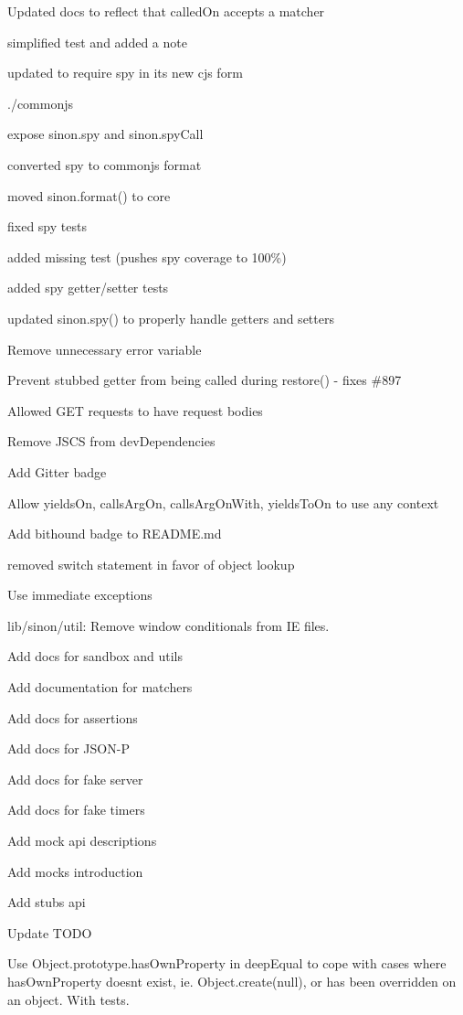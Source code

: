 \begin{DoxyItemize}
\item Updated docs to reflect that called\+On accepts a matcher
\item simplified test and added a note
\item updated to require spy in its new cjs form
\item ./commonjs
\item expose sinon.\+spy and sinon.\+spy\+Call
\item converted spy to commonjs format
\item moved sinon.\+format() to core
\item fixed spy tests
\item added missing test (pushes spy coverage to 100\%)
\item added spy getter/setter tests
\item updated sinon.\+spy() to properly handle getters and setters
\item Remove unnecessary error variable
\item Prevent stubbed getter from being called during restore() -\/ fixes \#897
\item Allowed G\+ET requests to have request bodies
\item Remove J\+S\+CS from dev\+Dependencies
\item Add Gitter badge
\item Allow yields\+On, calls\+Arg\+On, calls\+Arg\+On\+With, yields\+To\+On to use any context
\item Add bithound badge to R\+E\+A\+D\+M\+E.\+md
\item removed switch statement in favor of object lookup
\item Use immediate exceptions
\item lib/sinon/util\+: Remove window conditionals from IE files.
\item Add docs for sandbox and utils
\item Add documentation for matchers
\item Add docs for assertions
\item Add docs for J\+S\+O\+N-\/P
\item Add docs for fake server
\item Add docs for fake timers
\item Add mock api descriptions
\item Add mocks introduction
\item Add stubs api
\item Update T\+O\+DO
\item Use Object.\+prototype.\+has\+Own\+Property in deep\+Equal to cope with cases where has\+Own\+Property doesn\textquotesingle{}t exist, ie. Object.\+create(null), or has been overridden on an object. With tests.

\end{DoxyItemize}
